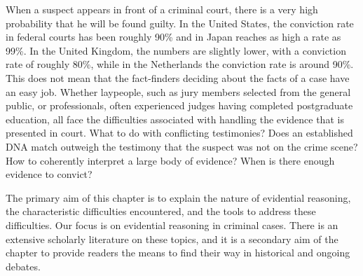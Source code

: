 \documentclass[10pt]{article}
\begin{document}
\noindent When a suspect appears in front of a criminal court, there is a very high probability that he will be found guilty. 
In the United States, the conviction rate in federal courts has been roughly 90\% and in Japan reaches as high a rate as 99\%. 
In the United Kingdom, the numbers are slightly lower, with a conviction rate of roughly 80\%, while in the Netherlands 
the conviction rate is around 90\%. 
This does not mean that the fact-finders deciding about the facts of a case have an easy job. Whether laypeople, such as jury members selected from the general public, or professionals, often experienced judges having completed postgraduate education, all face the difficulties associated with handling the evidence that is presented in court. What to do with conflicting testimonies? Does an established DNA match outweigh the testimony that the suspect was not on the crime scene? How to coherently interpret a large body of evidence? 
When is there enough evidence to convict? %

The primary aim of this chapter is to explain the nature of evidential reasoning, the characteristic difficulties encountered, and the tools to address these difficulties. 
Our focus is on evidential reasoning in criminal cases. There is an extensive scholarly literature on these topics, 
and it is a secondary aim of the chapter to provide readers the means to find their way in historical and ongoing debates. 


\end{document}
